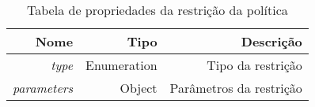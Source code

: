 \begin{table}[!htb]
    \centering
    \caption[resource-constraint-shape]{Tabela de propriedades da restrição da política
    \label{tab:constraint-shape}}
    \begin{tabular}{rrr}
        \toprule
            Nome & Tipo & Descrição \\ 
        \midrule
            \textit{type} & Enumeration & Tipo da restrição \\
            \textit{parameters} & Object &  Parâmetros da restrição \\
        \bottomrule
    \end{tabular}
\end{table}
